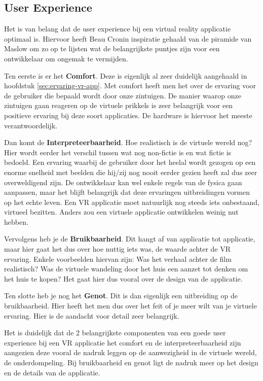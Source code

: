 \subsection{User Experience}
\label{subsec:user-experience}
Het is van belang dat de user experience bij een virtual reality applicatie optimaal is. Hiervoor heeft Beau Cronin \autocite{Cronin2015} inspiratie gehaald van de piramide van Maslow om zo op te lijsten wat de belangrijkste puntjes zijn voor een ontwikkelaar om ongemak te vermijden.

Ten eerste is er het \textbf{Comfort}. Deze is eigenlijk al zeer duidelijk aangehaald in hoofdstuk \ref{sec:ervaring-vr-app}. Met comfort heeft men het over de ervaring voor de gebruiker die bepaald wordt door onze zintuigen. De manier waarop onze zintuigen gaan reageren op de virtuele prikkels is zeer belangrijk voor een positieve ervaring bij deze soort applicaties. De hardware is hiervoor het meeste verantwoordelijk.

Dan komt de \textbf{Interpreteerbaarheid}. Hoe realistisch is de virtuele wereld nog? Hier wordt eerder het verschil tussen wat nog non-fictie is en wat fictie is bedoeld. Een ervaring waarbij de gebruiker door het heelal wordt gezogen op een enorme snelheid met beelden die hij/zij nog nooit eerder gezien heeft zal dus zeer overweldigend zijn. De ontwikkelaar kan wel enkele regels van de fysica gaan aanpassen, maar het blijft belangrijk dat deze ervaringen uitbreidingen vormen op het echte leven. Een VR applicatie moet natuurlijk nog steeds iets onbestaand, virtueel bezitten. Anders zou een virtuele applicatie ontwikkelen weinig nut hebben.

Vervolgens heb je de \textbf{Bruikbaarheid}. Dit hangt af van applicatie tot applicatie, maar hier gaat het dus over hoe nuttig iets was, de waarde achter de VR ervaring. Enkele voorbeelden hiervan zijn: Was het verhaal achter de film realistisch? Was de virtuele wandeling door het huis een aanzet tot denken om het huis te kopen? Het gaat hier dus vooral over de design van de applicatie.

Ten slotte heb je nog het \textbf{Genot}. Dit is dan eigenlijk een uitbreiding op de bruikbaarheid. Hier heeft het men dus over het feit of je meer wilt van je virtuele ervaring. Hier is de aandacht voor detail zeer belangrijk.

Het is duidelijk dat de 2 belangrijkste componenten van een goede user experience bij een VR applicatie het comfort en de interpreteerbaarheid zijn aangezien deze vooral de nadruk leggen op de aanwezigheid in de virtuele wereld, de onderdompeling. Bij bruikbaarheid en genot ligt de nadruk meer op het design en de details van de applicatie.


